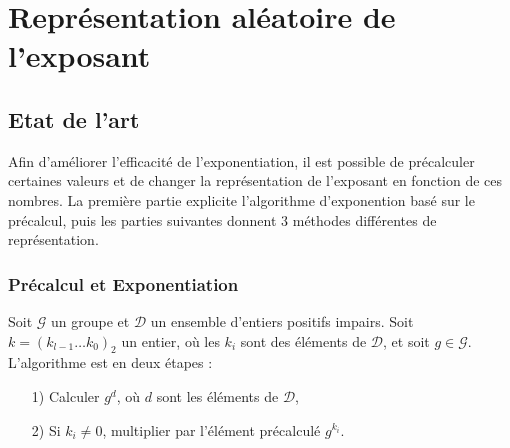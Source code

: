 \documentclass[12pt, a4paper]{memoir}
\begin{document}






\chapter{Représentation aléatoire de l'exposant}
\section{Etat de l'art}

Afin d'améliorer l'efficacité de l'exponentiation, il est possible de précalculer certaines valeurs et de changer la représentation
de l'exposant en fonction de ces nombres.
La première partie explicite l'algorithme d'exponention basé sur le précalcul, puis les parties suivantes donnent $3$ méthodes
différentes de représentation.

\subsection{Précalcul et Exponentiation}

Soit $\mathcal{G}$ un groupe et $\mathcal{D}$ un ensemble d'entiers positifs impairs.
Soit $k=(k_{l-1} \ldots k_0)_2$ un entier, où les $k_i$ sont des éléments de $\mathcal{D}$, et soit $g \in \mathcal{G}$.
L'algorithme est en deux étapes :
\begin{itemize}
 \item [1)] Calculer $g^d$, où $d$ sont les éléments de $\mathcal{D}$,
 \item [2)] Si $k_i \neq 0$, multiplier par l'élément précalculé $g^{k_i}$.
\end{itemize}
\end{document}
